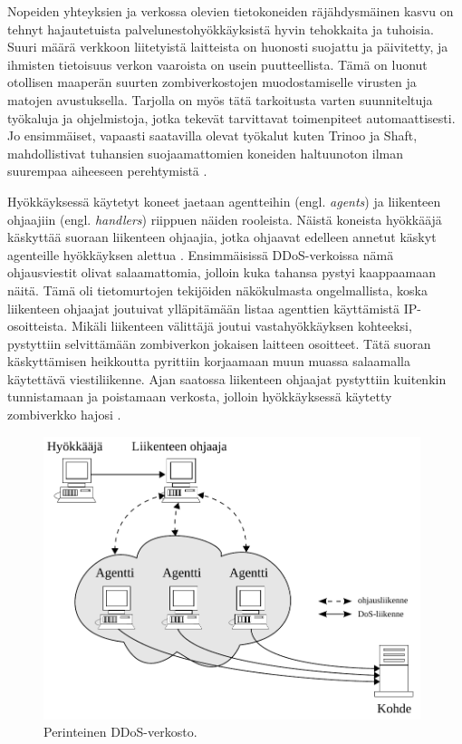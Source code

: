 Nopeiden yhteyksien ja verkossa olevien tietokoneiden räjähdysmäinen
kasvu on tehnyt hajautetuista palvelunestohyökkäyksistä hyvin
tehokkaita ja tuhoisia. Suuri määrä verkkoon liitetyistä laitteista on
huonosti suojattu ja päivitetty, ja ihmisten tietoisuus verkon
vaaroista on usein puutteellista. Tämä on luonut otollisen maaperän
suurten zombiverkostojen muodostamiselle virusten ja matojen
avustuksella. Tarjolla on myös tätä tarkoitusta varten suunniteltuja
työkaluja ja ohjelmistoja, jotka tekevät tarvittavat toimenpiteet
automaattisesti. Jo ensimmäiset, vapaasti saatavilla olevat työkalut
kuten Trinoo ja Shaft, mahdollistivat tuhansien suojaamattomien
koneiden haltuunoton ilman suurempaa aiheeseen perehtymistä \cite{DDOS}.

Hyökkäyksessä käytetyt koneet jaetaan agentteihin (engl. \textit{agents})
ja liikenteen ohjaajiin (engl. \textit{handlers}) riippuen näiden
rooleista. Näistä koneista hyökkääjä käskyttää suoraan liikenteen
ohjaajia, jotka ohjaavat edelleen annetut käskyt agenteille
hyökkäyksen alettua \cite{WEBS}\cite{DDOS}. Ensimmäisissä 
DDoS-verkoissa nämä ohjausviestit olivat salaamattomia, jolloin kuka tahansa
pystyi kaappaamaan näitä. Tämä oli tietomurtojen tekijöiden
näkökulmasta ongelmallista, koska liikenteen ohjaajat joutuivat
ylläpitämään listaa agenttien käyttämistä IP-osoitteista. Mikäli liikenteen välittäjä
joutui vastahyökkäyksen kohteeksi, pystyttiin selvittämään zombiverkon jokaisen
laitteen osoitteet. Tätä suoran käskyttämisen heikkoutta pyrittiin korjaamaan muun
muassa salaamalla käytettävä viestiliikenne. Ajan saatossa liikenteen
ohjaajat pystyttiin kuitenkin tunnistamaan ja poistamaan verkosta,
jolloin hyökkäyksessä käytetty zombiverkko hajosi \cite{DDOS}.

\begin{figure}[p]
\centering
\includegraphics[width=11cm]{pics/perinteinen_ddos.pdf}
\caption{Perinteinen DDoS-verkosto.}
\label{ddos1}
\end{figure}

